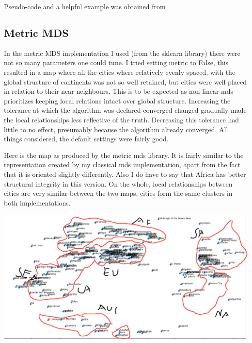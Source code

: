 \documentclass[11pt,a4paper,landscape]{article}
\begin{document}
Pseudo-code and a helpful example was obtained from \cite{mds}

\subsection{Metric MDS}

In the metric MDS implementation I used (from the sklearn library) there were not so many parameters one could tune. I tried setting metric to False, this resulted in a map where all the cities where relatively evenly spaced, with the global structure of continents was not so well retained, but cities were well placed in relation to their near neighbours. This is to be expected as non-linear mds prioritizes keeping local relations intact over global structure.  Increasing the tolerance at which the algorithm was declared converged changed gradually made the local relationships less reflective of the truth.  Decreasing this tolerance had little to no effect, presumably because the algorithm already converged. All things considered, the default settings were fairly good.\newline

Here is the map as produced by the metric mds library. It is fairly similar to the representation created by my classical mds implementation, apart from the fact that it is oriented slightly differently. Also I do have to say that Africa has better structural integrity in this version. On the whole, local relationships between cities are very similar between the two maps, cities form the same clusters in both implementations.

\begin{center}
	\includegraphics[scale= 0.4]{metric_annotated_world_map.jpg}
\end{center}




\end{document}

